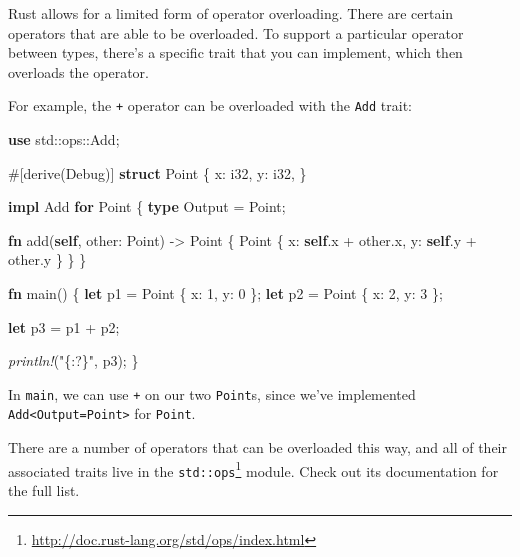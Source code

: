 \documentclass[a4paper,]{book}
\newenvironment{Shaded}{\begin{snugshade}}{\end{snugshade}}
\newcommand{\KeywordTok}[1]{\textcolor[rgb]{0.13,0.29,0.53}{\textbf{{#1}}}}
\newcommand{\DataTypeTok}[1]{\textcolor[rgb]{0.13,0.29,0.53}{{#1}}}
\newcommand{\DecValTok}[1]{\textcolor[rgb]{0.00,0.00,0.81}{{#1}}}
\newcommand{\StringTok}[1]{\textcolor[rgb]{0.31,0.60,0.02}{{#1}}}
\newcommand{\BuiltInTok}[1]{{#1}}
\newcommand{\PreprocessorTok}[1]{\textcolor[rgb]{0.56,0.35,0.01}{\textit{{#1}}}}
\newcommand{\AttributeTok}[1]{\textcolor[rgb]{0.77,0.63,0.00}{{#1}}}
\newcommand{\NormalTok}[1]{{#1}}
\renewcommand{\href}[2]{#2\footnote{\url{#1}}}
\begin{document}

Rust allows for a limited form of operator overloading. There are
certain operators that are able to be overloaded. To support a
particular operator between types, there's a specific trait that you can
implement, which then overloads the operator.

For example, the \texttt{+} operator can be overloaded with the
\texttt{Add} trait:

\begin{Shaded}
\begin{Highlighting}[]
\KeywordTok{use} \NormalTok{std::ops::Add;}

\AttributeTok{#[}\NormalTok{derive}\AttributeTok{(}\BuiltInTok{Debug}\AttributeTok{)]}
\KeywordTok{struct} \NormalTok{Point \{}
    \NormalTok{x: }\DataTypeTok{i32}\NormalTok{,}
    \NormalTok{y: }\DataTypeTok{i32}\NormalTok{,}
\NormalTok{\}}

\KeywordTok{impl} \NormalTok{Add }\KeywordTok{for} \NormalTok{Point \{}
    \KeywordTok{type} \NormalTok{Output = Point;}

    \KeywordTok{fn} \NormalTok{add(}\KeywordTok{self}\NormalTok{, other: Point) -> Point \{}
        \NormalTok{Point \{ x: }\KeywordTok{self}\NormalTok{.x + other.x, y: }\KeywordTok{self}\NormalTok{.y + other.y \}}
    \NormalTok{\}}
\NormalTok{\}}

\KeywordTok{fn} \NormalTok{main() \{}
    \KeywordTok{let} \NormalTok{p1 = Point \{ x: }\DecValTok{1}\NormalTok{, y: }\DecValTok{0} \NormalTok{\};}
    \KeywordTok{let} \NormalTok{p2 = Point \{ x: }\DecValTok{2}\NormalTok{, y: }\DecValTok{3} \NormalTok{\};}

    \KeywordTok{let} \NormalTok{p3 = p1 + p2;}

    \PreprocessorTok{println!}\NormalTok{(}\StringTok{"\{:?\}"}\NormalTok{, p3);}
\NormalTok{\}}
\end{Highlighting}
\end{Shaded}

In \texttt{main}, we can use \texttt{+} on our two \texttt{Point}s,
since we've implemented
\texttt{Add\textless{}Output=Point\textgreater{}} for \texttt{Point}.

There are a number of operators that can be overloaded this way, and all
of their associated traits live in the
\href{http://doc.rust-lang.org/std/ops/index.html}{\texttt{std::ops}}
module. Check out its documentation for the full list.
\end{document}
